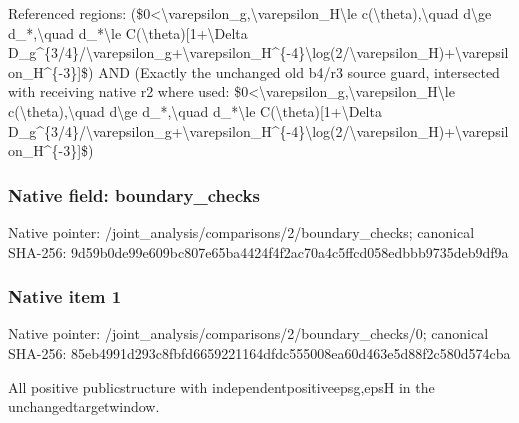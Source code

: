 \documentclass[10pt,a4paper]{article}
\begin{document}
\begingroup\raggedright\sloppy Referenced regions:\allowbreak{} (\$0<\textbackslash{}varepsilon\_\allowbreak{}g,\allowbreak{}\textbackslash{}varepsilon\_\allowbreak{}H\textbackslash{}le c(\textbackslash{}theta),\allowbreak{}\textbackslash{}quad d\textbackslash{}ge d\_\allowbreak{}*,\allowbreak{}\textbackslash{}quad d\_\allowbreak{}*\textbackslash{}le C(\textbackslash{}theta)[1+\textbackslash{}Delta D\_\allowbreak{}g\textasciicircum{}\{3/\allowbreak{}4\}/\allowbreak{}\textbackslash{}varepsilon\_\allowbreak{}g+\textbackslash{}varepsilon\_\allowbreak{}H\textasciicircum{}\{-4\}\textbackslash{}log(2/\allowbreak{}\textbackslash{}varepsilon\_\allowbreak{}H)+\textbackslash{}varepsilon\_\allowbreak{}H\textasciicircum{}\{-3\}]\$) AND (Exactly the unchanged old b4/\allowbreak{}r3 source guard,\allowbreak{} intersected with receiving native r2 where used:\allowbreak{} \$0<\textbackslash{}varepsilon\_\allowbreak{}g,\allowbreak{}\textbackslash{}varepsilon\_\allowbreak{}H\textbackslash{}le c(\textbackslash{}theta),\allowbreak{}\textbackslash{}quad d\textbackslash{}ge d\_\allowbreak{}*,\allowbreak{}\textbackslash{}quad d\_\allowbreak{}*\textbackslash{}le C(\textbackslash{}theta)[1+\textbackslash{}Delta D\_\allowbreak{}g\textasciicircum{}\{3/\allowbreak{}4\}/\allowbreak{}\textbackslash{}varepsilon\_\allowbreak{}g+\textbackslash{}varepsilon\_\allowbreak{}H\textasciicircum{}\{-4\}\textbackslash{}log(2/\allowbreak{}\textbackslash{}varepsilon\_\allowbreak{}H)+\textbackslash{}varepsilon\_\allowbreak{}H\textasciicircum{}\{-3\}]\$)\par\endgroup

\subsubsection{Native field: boundary\_\allowbreak{}checks}
Native pointer: /joint\_\allowbreak{}analysis/comparisons/2/boundary\_\allowbreak{}checks; canonical SHA-256: 9d59b0de99e609bc807e65ba4424f4f2ac70a4c5ffcd058edbbb9735deb9df9a

\subsubsection{Native item 1}
Native pointer: /joint\_\allowbreak{}analysis/comparisons/2/boundary\_\allowbreak{}checks/0; canonical SHA-256: 85eb4991d293c8fbfd6659221164dfdc555008ea60d463e5d88f2c580d574cba

\begingroup\raggedright\sloppy All positive publicstructure with independentpositiveepsg,\allowbreak{}epsH in the unchangedtargetwindow.\par\endgroup
\end{document}
